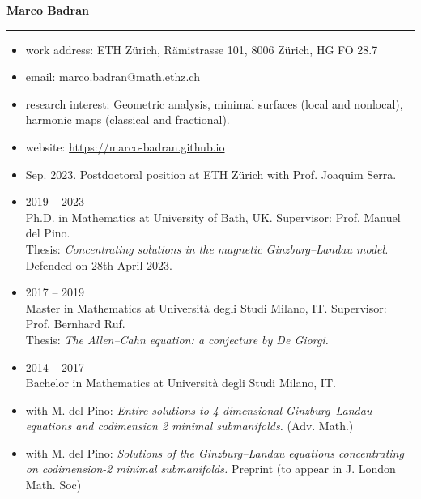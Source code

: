 \documentclass[12pt]{amsart}
\begin{document}
\begin{center}{\large{\bf Marco Badran}}\end{center}
\noindent\rule{\textwidth}{.8pt}
\medskip\bigskip

\begin{itemize}
	\item {work address}: {ETH Z\"urich, R\"amistrasse 101, 8006 Z\"urich, HG FO 28.7}
	\item {email}: marco.badran@math.ethz.ch
	\item {research interest}: Geometric analysis, minimal surfaces (local and nonlocal), harmonic maps (classical and fractional).
	\item {website}:  {\color{blue} \url{https://marco-badran.github.io}}
\end{itemize}

\bigskip\medskip
{}
\begin{itemize}
	\item {Sep. 2023.} Postdoctoral position at ETH Z\"urich with Prof. Joaquim Serra.
\end{itemize}

\bigskip\medskip
{}
\begin{itemize}
	\item {2019 -- 2023}\\ 
		Ph.D. in Mathematics at University of Bath, UK. Supervisor: Prof. Manuel del Pino.\\
		Thesis: \emph{Concentrating solutions in the magnetic Ginzburg--Landau model.}
		Defended on 28th April 2023.
	
	\medskip
	
	\item {2017 -- 2019}\\  Master in Mathematics at Universit\`a degli Studi Milano, IT. Supervisor: Prof. Bernhard Ruf. \\
		Thesis: \emph{The Allen--Cahn equation: a conjecture by De Giorgi.}
	
	\medskip
	
	\item {2014 -- 2017}\\  Bachelor in Mathematics at Universit\`a degli Studi Milano, IT.
\end{itemize}

\bigskip\medskip
{}
\begin{itemize}
	\item with M. del Pino:
		\emph{Entire solutions to 4-dimensional Ginzburg--Landau equations and codimension 2 minimal submanifolds.} (Adv. Math.)
	\item with M. del Pino: \emph{Solutions of the Ginzburg--Landau equations concentrating on codimension-2 minimal submanifolds.} Preprint (to appear in J. London Math. Soc)
\end{itemize}
\end{document}
